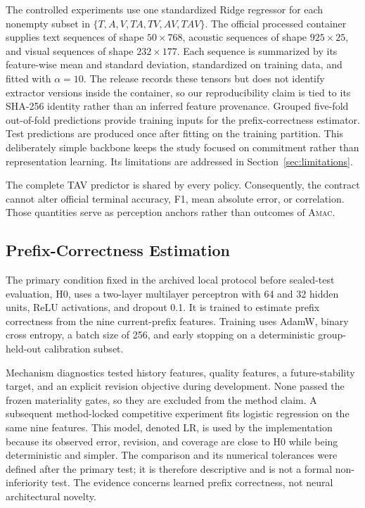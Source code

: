 \documentclass[journal]{IEEEtran}
\newcommand{\method}{\textsc{Amac}}
\begin{document}
The controlled experiments use one standardized Ridge regressor for each nonempty subset in $\{T,A,V,TA,TV,AV,TAV\}$. The official processed container supplies text sequences of shape $50\times768$, acoustic sequences of shape $925\times25$, and visual sequences of shape $232\times177$. Each sequence is summarized by its feature-wise mean and standard deviation, standardized on training data, and fitted with $\alpha=10$. The release records these tensors but does not identify extractor versions inside the container, so our reproducibility claim is tied to its SHA-256 identity rather than an inferred feature provenance. Grouped five-fold out-of-fold predictions provide training inputs for the prefix-correctness estimator. Test predictions are produced once after fitting on the training partition. This deliberately simple backbone keeps the study focused on commitment rather than representation learning. Its limitations are addressed in Section~\ref{sec:limitations}.

The complete TAV predictor is shared by every policy. Consequently, the contract cannot alter official terminal accuracy, F1, mean absolute error, or correlation. Those quantities serve as perception anchors rather than outcomes of \method{}.

\subsection{Prefix-Correctness Estimation}

The primary condition fixed in the archived local protocol before sealed-test evaluation, H0, uses a two-layer multilayer perceptron with 64 and 32 hidden units, ReLU activations, and dropout 0.1. It is trained to estimate prefix correctness from the nine current-prefix features. Training uses AdamW, binary cross entropy, a batch size of 256, and early stopping on a deterministic group-held-out calibration subset.

Mechanism diagnostics tested history features, quality features, a future-stability target, and an explicit revision objective during development. None passed the frozen materiality gates, so they are excluded from the method claim. A subsequent method-locked competitive experiment fits logistic regression on the same nine features. This model, denoted LR, is used by the implementation because its observed error, revision, and coverage are close to H0 while being deterministic and simpler. The comparison and its numerical tolerances were defined after the primary test; it is therefore descriptive and is not a formal non-inferiority test. The evidence concerns learned prefix correctness, not neural architectural novelty.
\end{document}
